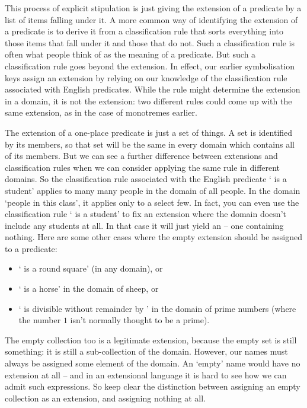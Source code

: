 This process of explicit stipulation is just giving the extension of a predicate by a list of items falling under it. A more common way of identifying the extension of a predicate is to derive it from a classification rule that sorts everything into those items that fall under it and those that do not. Such a classification rule is often what people think of as the meaning of a predicate. But such a classification rule goes beyond the extension. In effect, our earlier symbolisation keys assign an extension by relying on our knowledge of the classification rule associated with English predicates. While the rule might determine the extension in a domain, it is not the extension: two different rules could come up with the same extension, as in the case of monotremes earlier. 

The extension of a one-place predicate is just a set of things. A set is identified by its members, so that set will be the same in every domain which contains all of its members. But we can see a further difference between extensions and classification rules when we can consider applying the same rule in different domains. So the classification rule associated with the English predicate `\gap{} is a student' applies to many many people in the domain of all people. In the domain `people in this class', it applies only to a select few. In fact, you can even use the classification rule `\gap{} is a student' to fix an extension where the domain doesn't include any students at all. In that case it will just yield an  – one containing nothing. Here are some other cases where the empty extension should be assigned to a predicate:  \begin{itemize}
	\item ` is a round square' (in any domain), or
	\item  ` is a horse' in the domain of sheep, or
	\item ` is divisible without remainder by ' in the domain of prime numbers (where the number $1$ isn't normally thought to be a prime).
\end{itemize}

The empty collection too is a legitimate extension, because the empty set is still something: it is still a sub-collection of the domain. However, our names must always be assigned some element of the domain. An `empty' name would have no extension at all – and in an extensional language it is hard to see how we can admit such expressions. So keep clear the distinction between assigning an empty collection as an extension, and assigning nothing at all.  

